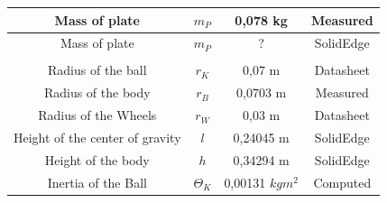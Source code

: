 \documentclass[twoside,colorback,accentcolor=tud4c,11pt]{tudreport}
\begin{document}
\begin{table}[]
\begin{tabular}{cccc}
\multicolumn{1}{|c|}{Mass of plate}                                                                                     & \multicolumn{1}{c|}{$m_{P}$}                & \multicolumn{1}{c|}{0,078 kg}                              & \multicolumn{1}{c|}{Measured}              \\ \hline
\multicolumn{1}{|c|}{Mass of plate}                                                                                     & \multicolumn{1}{c|}{$m_{P}$}                & \multicolumn{1}{c|}{?}                                     & \multicolumn{1}{c|}{SolidEdge}             \\ \hline
                                                                                                                        &                                              &                                                            &                                            \\ \hline
\multicolumn{1}{|c|}{Radius of the ball}                                                                                & \multicolumn{1}{c|}{$r_{K}$}                & \multicolumn{1}{c|}{0,07 m}                                & \multicolumn{1}{c|}{Datasheet}             \\ \hline
\multicolumn{1}{|c|}{Radius of the body}                                                                                & \multicolumn{1}{c|}{$r_{B}$}                & \multicolumn{1}{c|}{0,0703 m}                              & \multicolumn{1}{c|}{Measured}              \\ \hline
\multicolumn{1}{|c|}{Radius of the Wheels}                                                                              & \multicolumn{1}{c|}{$r_{W}$}                & \multicolumn{1}{c|}{0,03 m}                                & \multicolumn{1}{c|}{Datasheet}             \\ \hline
\multicolumn{1}{|c|}{Height of the center of gravity}                                                                   & \multicolumn{1}{c|}{$l$}                       & \multicolumn{1}{c|}{0,24045 m}                             & \multicolumn{1}{c|}{SolidEdge}             \\ \hline
\multicolumn{1}{|c|}{Height of the body}                                                                                & \multicolumn{1}{c|}{$h$}                       & \multicolumn{1}{c|}{0,34294 m}                             & \multicolumn{1}{c|}{SolidEdge}             \\ \hline
\multicolumn{1}{|c|}{Inertia of the Ball}                                                                               & \multicolumn{1}{c|}{$\Theta_{K}$}           & \multicolumn{1}{c|}{0,00131 $kgm^{2}$}     & \multicolumn{1}{c|}{Computed}              \\ \hline

\end{tabular}
\end{table}
\end{document}
